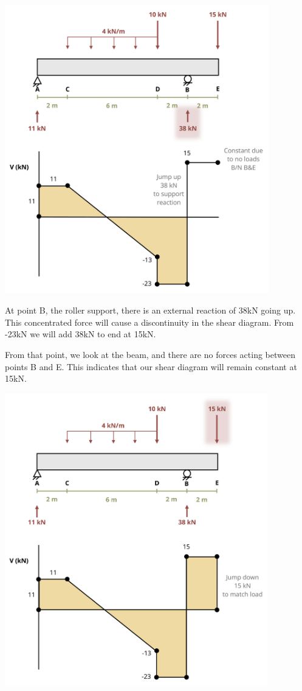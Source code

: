 \documentclass[
  letterpaper,
  DIV=11,
  numbers=noendperiod]{scrreprt}
\begin{document}
\begin{tcolorbox}
\begin{center}
\includegraphics[width=4.51042in,height=\textheight]{images/CH7 PNGs/example 7.3 part 6.png}
\end{center}

At point B, the roller support, there is an external reaction of 38kN
going up. This concentrated force will cause a discontinuity in the
shear diagram. From -23kN we will add 38kN to end at 15kN.

From that point, we look at the beam, and there are no forces acting
between points B and E. This indicates that our shear diagram will
remain constant at 15kN.

\begin{center}
\includegraphics[width=4.5in,height=\textheight]{images/CH7 PNGs/example 7.3 part 7.png}
\end{center}


\end{tcolorbox}
\end{document}
